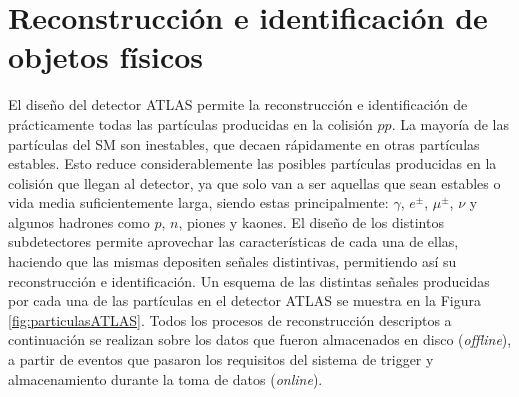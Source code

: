 \chapter{Reconstrucción e identificación de objetos físicos}\label{cap:objects}



El diseño del detector ATLAS permite la reconstrucción e identificación de prácticamente todas las
partículas producidas en la colisión $pp$. 
La mayoría de las partículas del SM son inestables, que decaen rápidamente en otras partículas estables. Esto reduce considerablemente las posibles partículas producidas en la colisión que llegan al detector, ya que solo van a ser aquellas que sean estables o vida media suficientemente larga, siendo estas principalmente: $\gamma$, $e^{\pm}$, $\mu^{\pm}$, $\nu$ y algunos hadrones
como $p$, $n$, piones y kaones. El diseño de los distintos subdetectores permite aprovechar las
características de cada una de ellas, haciendo que las mismas depositen señales distintivas, permitiendo así su reconstrucción e identificación. Un esquema de las distintas señales producidas por cada una de las partículas en el detector ATLAS se muestra en la Figura \ref{fig:particulasATLAS}. Todos los procesos de reconstrucción descriptos a continuación se realizan sobre los datos que fueron almacenados en disco (\textit{offline}), a partir de eventos que pasaron los requisitos del sistema de trigger y almacenamiento durante la toma de datos (\textit{online}).




